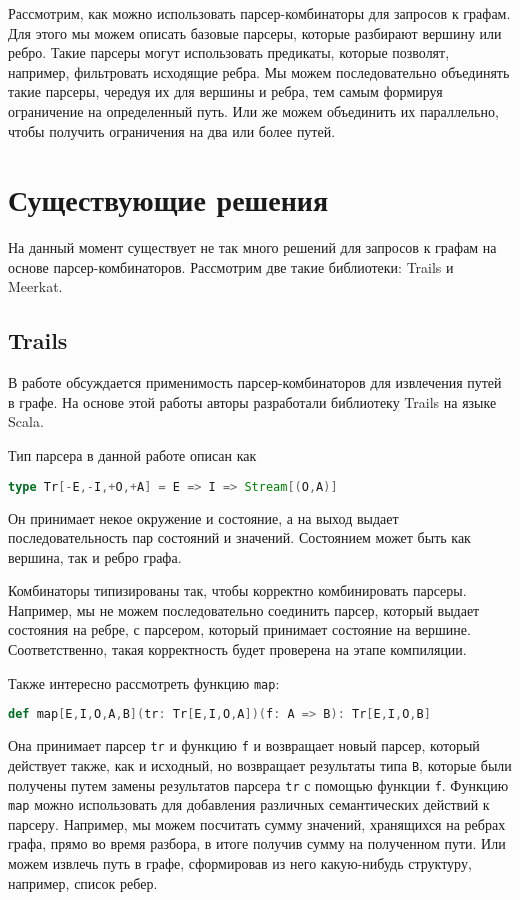 Рассмотрим, как можно использовать парсер-комбинаторы для запросов к графам.
Для этого мы можем описать базовые парсеры, которые разбирают вершину или ребро.
Такие парсеры могут использовать предикаты, которые позволят, например, фильтровать исходящие ребра.
Мы можем последовательно объединять такие парсеры, чередуя их для вершины и ребра, тем самым формируя ограничение на определенный путь.
Или же можем объединить их параллельно, чтобы получить ограничения на два или более путей.


\section{Существующие решения}

На данный момент существует не так много решений для запросов к графам на основе парсер-комбинаторов.
Рассмотрим две такие библиотеки: Trails и Meerkat.

\subsection{Trails}

В работе \cite{Trails} обсуждается применимость парсер-комбинаторов для извлечения путей в графе. На основе этой работы авторы разработали библиотеку Trails на языке Scala.

Тип парсера в данной работе описан как
\begin{lstlisting}[language=Scala, numbers=none, frame=none]
type Tr[-E,-I,+O,+A] = E => I => Stream[(O,A)] 
\end{lstlisting}
Он принимает некое окружение и состояние, а на выход выдает последовательность пар состояний и значений. Состоянием может быть как вершина, так и ребро графа.

Комбинаторы типизированы так, чтобы корректно комбинировать парсеры. Например, мы не можем последовательно соединить парсер, который выдает состояния на ребре, с парсером, который принимает состояние на вершине. Соответственно, такая корректность будет проверена на этапе компиляции.

Также интересно рассмотреть функцию \verb|map|:
\begin{lstlisting}[language=Scala, numbers=none, frame=none]
def map[E,I,O,A,B](tr: Tr[E,I,O,A])(f: A => B): Tr[E,I,O,B]
\end{lstlisting}
Она принимает парсер \verb|tr| и функцию \verb|f| и возвращает новый парсер, который действует также, как и исходный, но возвращает результаты типа \verb|B|, которые были получены путем замены результатов парсера \verb|tr| с помощью функции \verb|f|. 
Функцию \texttt{map} можно использовать для добавления различных семантических действий к парсеру. 
Например, мы можем посчитать сумму значений, хранящихся на ребрах графа, прямо во время разбора, в итоге получив сумму на полученном пути.
Или можем извлечь путь в графе, сформировав из него какую-нибудь структуру, например, список ребер.

